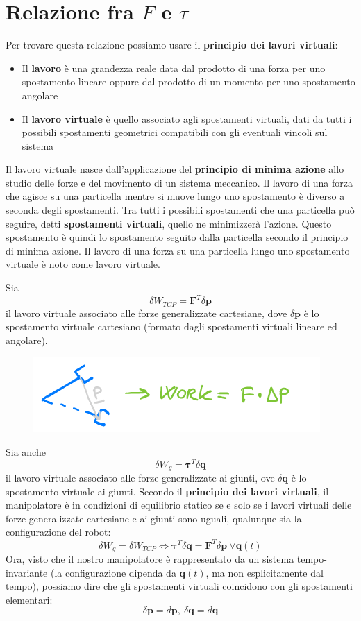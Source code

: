 \section{Relazione fra $F$ e $\tau$}
Per trovare questa relazione possiamo usare il \textbf{principio dei lavori virtuali}:
\begin{itemize}
	\item Il \textbf{lavoro} è una grandezza reale data dal prodotto di una forza per uno spostamento lineare oppure dal prodotto di un momento per uno spostamento angolare
	\item Il \textbf{lavoro virtuale} è quello associato agli spostamenti virtuali, dati da tutti i possibili spostamenti geometrici compatibili con gli eventuali vincoli sul sistema
\end{itemize}
Il lavoro virtuale nasce dall'applicazione del \textbf{principio di minima azione} allo studio delle forze e del movimento di un sistema meccanico. Il lavoro di una forza che agisce su una particella mentre si muove lungo uno spostamento è diverso a seconda degli spostamenti. Tra tutti i possibili spostamenti che una particella può seguire, detti \textbf{spostamenti virtuali}, quello ne minimizzerà l'azione. Questo spostamento è quindi lo spostamento seguito dalla particella secondo il principio di minima azione. Il lavoro di una forza su una particella lungo uno spostamento virtuale è noto come lavoro virtuale.

Sia
$$
\delta W_{TCP} = \bm{F}^T\delta\bm{p}
$$
il lavoro virtuale associato alle forze generalizzate cartesiane, dove $\delta\bm{p}$ è lo spostamento virtuale cartesiano (formato dagli spostamenti virtuali lineare ed angolare). 
\begin{figure}[H]
	\centering
	\includegraphics[width=0.3\linewidth]{images/statics_2}
	\label{fig:statics2}
\end{figure}

Sia anche
$$
\delta W_{g} = \bm{\tau}^T\delta\bm{q}
$$
il lavoro virtuale associato alle forze generalizzate ai giunti, ove $\delta\bm{q}$ è lo spostamento virtuale ai giunti.
Secondo il \textbf{principio dei lavori virtuali}, il manipolatore è in condizioni di equilibrio statico se e solo se i lavori virtuali delle forze generalizzate cartesiane e ai giunti sono uguali, qualunque sia la configurazione del robot:
$$
\delta W_g = \delta W_{TCP}
\iff
\bm{\tau}^T\delta \bm{q} = \bm{F}^T\delta\bm{p} \ \forall \bm{q}(t)
$$
Ora, visto che il nostro manipolatore è rappresentato da un sistema tempo-invariante (la configurazione dipenda da $\bm{q}(t)$, ma non esplicitamente dal tempo), possiamo dire che gli spostamenti virtuali coincidono con gli spostamenti elementari:
$$
\delta\bm{p}= d \bm{p}, \ \delta\bm{q} = d\bm{q}
$$

